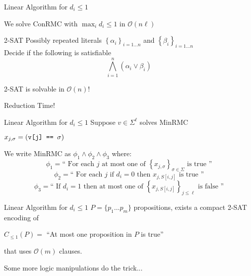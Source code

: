 \documentclass{beamer}
\renewcommand{\l}{\left}
\renewcommand{\r}{\right}
\begin{document}
\begin{frame}{Linear Algorithm for $d_i \leq 1$}

  \begin{center}
    We solve ConRMC with $\max_i d_i \leq 1$ in $\mathcal{O}\l(n\ell\r)$
  \end{center}
\pause
    \begin{block}{2-SAT}
      Possibly repeated literals $\l\{\alpha_i\r\}_{i = 1
        \dots n}$ and $\l\{\beta_i\r\}_{i = 1 \dots n}$ \\
      Decide if the following is satisfiable 
      $$\bigwedge_{i = 1}^n \l(\alpha_i \lor
      \beta_i\r)$$
    
    \end{block}

    \begin{center}
      2-SAT is solvable in $\mathcal{O}(n)$!
    \end{center}
\pause
    \begin{center}
      \Huge{Reduction Time!}
    \end{center}
    
\end{frame}

\begin{frame}{Linear Algorithm for $d_i \leq 1$}
  Suppose $v \in \Sigma^\ell $ solves MinRMC
  \begin{center}
    $x_{j, \sigma} = \l(\text{\texttt{v[j] == $\sigma$}} \r)$
  \end{center}
\pause
  We write MinRMC as $\phi_1 \land \phi_2 \land \phi_3$ where:
  \begin{equation*}
    \phi_1
    = \text{`` For each $j$ at most one of $\l\{x_{j,
        \sigma}\r\}_{\sigma \in \Sigma}$ is true ''}
\end{equation*}
\pause
\begin{equation*}
  \phi_2 = \text{`` For each $j$ if $d_i = 0$ then $x_{j, S[i,j]}$ is true ''} 
\end{equation*}
\pause
\begin{equation*}
  \phi_3 = \text{`` If $d_i = 1$ then at most one of $\l\{x_{j, S[i,
      j]}\r\}_{j \leq \ell}$ is false ''} 
\end{equation*}
  
\end{frame}

\begin{frame}{Linear Algorithm for $d_i \leq 1$}
$P = \{p_1 \dots p_m\}$ propositions, exists a compact 2-SAT
encoding of

\begin{center}
  $C_{\leq 1}(P) = $ ``At most one proposition in $P$ is true'' 
\end{center}

that uses $\mathcal{O}(m)$ clauses. 
\pause
\vspace{3em}
\begin{center}
  {\LARGE Some more logic manipulations do the trick...}
\end{center}

\end{frame}
\end{document}
